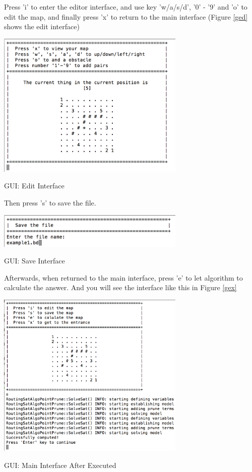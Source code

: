 \documentclass[twocolumn]{article}
\begin{document}
Press 'i' to enter the editor interface, and use key 'w/a/s/d', '0' - '9' and 'o' to edit the map, and finally press 'x' to return to the main interface (Figure \ref{ged} shows the edit interface)

\begin{center}
\makeatletter
\def\@captype{figure}
\makeatother
\includegraphics [width = 9cm]{GUI-edit}
\caption{GUI: Edit Interface}
\label{ged}
\end{center}

Then press 's' to save the file.

\begin{center}
\makeatletter
\def\@captype{figure}
\makeatother
\includegraphics [width = 9cm]{GUI-save}
\caption{GUI: Save Interface}
\label{gs}
\end{center}

Afterwards, when returned to the main interface, press 'e' to let algorithm to calculate the answer. And you will see the interface like this in Figure \ref{gex}

\begin{center}
\makeatletter
\def\@captype{figure}
\makeatother
\includegraphics [width = 9cm]{GUI-execute}
\caption{GUI: Main Interface After Executed}
\label{gex}
\end{center}
\end{document}
